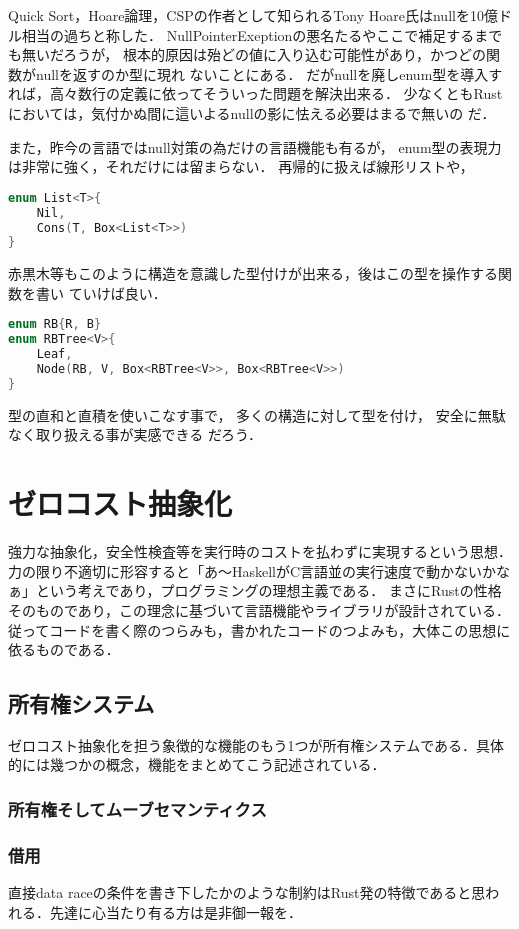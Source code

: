Quick Sort，Hoare論理，CSPの作者として知られるTony Hoare氏はnullを10億ドル相当の過ちと称した．
NullPointerExeptionの悪名たるやここで補足するまでも無いだろうが，
根本的原因は殆どの値に入り込む可能性があり，かつどの関数がnullを返すのか型に現れ
ないことにある．
だがnullを廃しenum型を導入すれば，高々数行の定義に依ってそういった問題を解決出来る．
少なくともRustにおいては，気付かぬ間に這いよるnullの影に怯える必要はまるで無いの
だ．

また，昨今の言語ではnull対策の為だけの言語機能も有るが，
enum型の表現力は非常に強く，それだけには留まらない．
再帰的に扱えば線形リストや，
\begin{lstlisting}[language={C++},caption=線形リスト,label=list_t]
enum List<T>{
    Nil,
    Cons(T, Box<List<T>>)
}
\end{lstlisting}
赤黒木等もこのように構造を意識した型付けが出来る，後はこの型を操作する関数を書い
ていけば良い．
\begin{lstlisting}[language={C++},caption=線形リスト,label=list_t]
enum RB{R, B}
enum RBTree<V>{
    Leaf,
    Node(RB, V, Box<RBTree<V>>, Box<RBTree<V>>)
}
\end{lstlisting}

型の直和と直積を使いこなす事で，
多くの構造に対して型を付け，
安全に無駄なく取り扱える事が実感できる
だろう．

\section{ゼロコスト抽象化}
強力な抽象化，安全性検査等を実行時のコストを払わずに実現するという思想．
力の限り不適切に形容すると「あ〜HaskellがC言語並の実行速度で動かないかなぁ」という考えであり，プログラミングの理想主義である．
まさにRustの性格そのものであり，この理念に基づいて言語機能やライブラリが設計されている．
従ってコードを書く際のつらみも，書かれたコードのつよみも，大体この思想に依るものである．


\subsection{所有権システム}
ゼロコスト抽象化を担う象徴的な機能のもう1つが所有権システムである．具体的には幾つかの概念，機能をまとめてこう記述されている．

\subsubsection{所有権そしてムーブセマンティクス}

\subsubsection{借用}
直接data raceの条件を書き下したかのような制約はRust発の特徴であると思われる．先達に心当たり有る方は是非御一報を．

